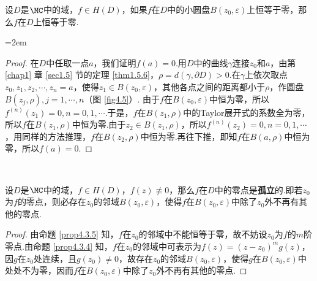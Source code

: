 \begin{prop}\label{prop4.3.5}
设$D$是$\MC$中的域，$f\in H(D)$，如果$f$在$D$中的小圆盘$B(z_0,\varepsilon)$上恒等于零，那么$f$在$D$上恒等于零.
\end{prop}
\noindent\begin{minipage}{0.65\textwidth}\parindent=2em
\begin{proof}
在$D$中任取一点$a$，我们证明$f(a)=0$.用$D$中的曲线$\gamma$连接$z_0$和$a$，由第 \ref{chap1} 章 \ref{sec1.5} 节的定理 \ref{thm1.5.6}，$\rho=d(\gamma,\partial D)>0$.在$\gamma$上依次取点$z_0,z_1,z_2,\cdots,z_n=a$，使得$z_1\in B(z_0,\varepsilon)$，其他各点之间的距离都小于$\rho$，作圆盘$B(z_j,\rho),j=1,\cdots,n$（图 \ref{fig4.5}）. 由于$f$在$B(z_0,\varepsilon)$中恒为零，所以$f^{(n)}(z_1)=0,n=0,1,\cdots$.于是，$f$在$B(z_1,\rho)$中的Taylor展开式的系数全为零，所以$f$在$B(z_1,\rho)$中恒为零.由于$z_2\in B(z_1,\rho)$，所以$f^{(n)}(z_2)=0,n=0,1,\cdots$，用同样的方法推理，$f$在$B(z_2,\rho)$中恒为零.再往下推，即知$f$在$B(a,\rho)$中恒为零，所以$f(a)=0$.
\end{proof}
\end{minipage}
\begin{minipage}{0.36\textwidth}
\centering
{}
\end{minipage}\\[1mm]

\begin{prop}\label{prop4.3.6}
设$D$是$\MC$中的域，$f\in H(D)$，$f(z)\not\equiv0$，那么$f$在$D$中的零点是\textbf{孤立}的.即若$z_0$为$f$的零点，则必存在$z_0$的邻域$B(z_0,\varepsilon)$，使得$f$在$B(z_0,\varepsilon)$中除了$z_0$外不再有其他的零点.
\end{prop}
\begin{proof}
由命题 \ref{prop4.3.5} 知，$f$在$z_0$的邻域中不能恒等于零，故不妨设$z_0$为$f$的$m$阶零点.由命题 \ref{prop4.3.4} 知，$f$在$z_0$的邻域中可表示为$f(z)=(z-z_0)^mg(z)$，因$g$在$z_0$处连续，且$g(z_0)\ne0$，故存在$z_0$的邻域$B(z_0,\varepsilon)$，使得$g$在$B(z_0,\varepsilon)$中处处不为零，因而$f$在$B(z_0,\varepsilon)$中除了$z_0$外不再有其他的零点.
\end{proof}

